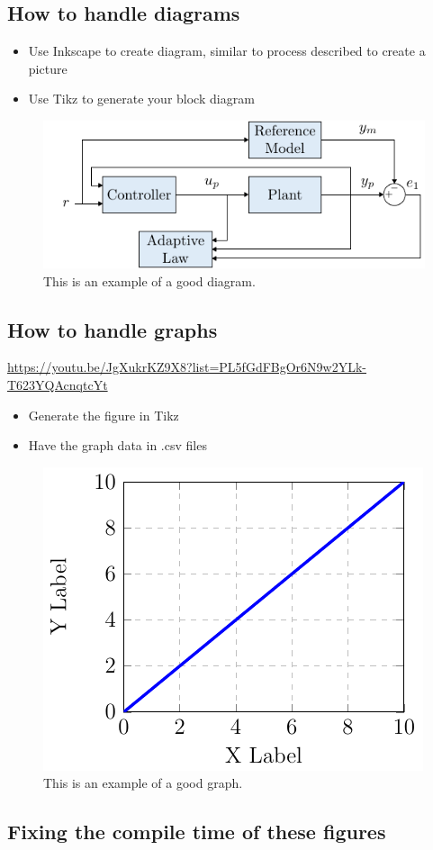 \documentclass[12pt]{article}
\begin{document}
\subsection*{How to handle diagrams}
\begin{itemize}
	\item Use Inkscape to create diagram, similar to process described to create a picture
	\item Use Tikz to generate your block diagram
\end{itemize}

\begin{figure}[!h]
	\centering
	\includegraphics{figures/test_diagram}
	\caption{This is an example of a good diagram.}
	\label{fig:testdiagram}
\end{figure}

\subsection*{How to handle graphs}
\url{https://youtu.be/JgXukrKZ9X8?list=PL5fGdFBgOr6N9w2YLk-T623YQAcnqtcYt}
\begin{itemize}
	\item Generate the figure in Tikz
	\item Have the graph data in .csv files
\end{itemize}

\begin{figure}[!h]
	\centering
	\includegraphics{figures/test_graph}
	\caption{This is an example of a good graph.}
	\label{fig:testgraph}
\end{figure}


\subsection*{Fixing the compile time of these figures}
\end{document}
